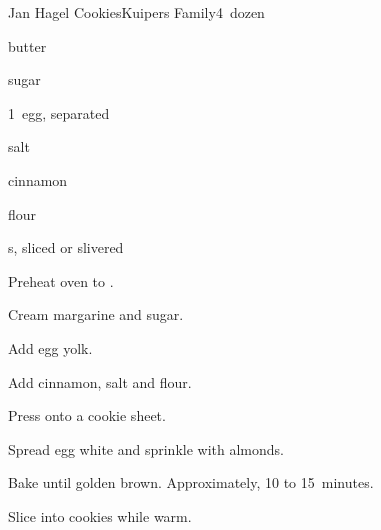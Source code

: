 \begin{recipe}{Jan Hagel Cookies}{Kuipers Family}{4~dozen}

\begin{ingredients}
\item {} butter
\item {} sugar
\item 1~egg, separated
\item \tp{\half} salt
\item \tp{\half} cinnamon
\item {} flour
\item {}s, sliced or slivered
\end{ingredients}

\begin{directions}
\item Preheat oven to .
\item Cream margarine and sugar.
\item Add egg yolk.
\item Add cinnamon, salt and flour.
\item Press onto a cookie sheet.
\item Spread egg white and sprinkle with almonds.
\item Bake until golden brown. Approximately, 10 to 15~minutes.
\item Slice into cookies while warm.
\end{directions}
\end{recipe}
